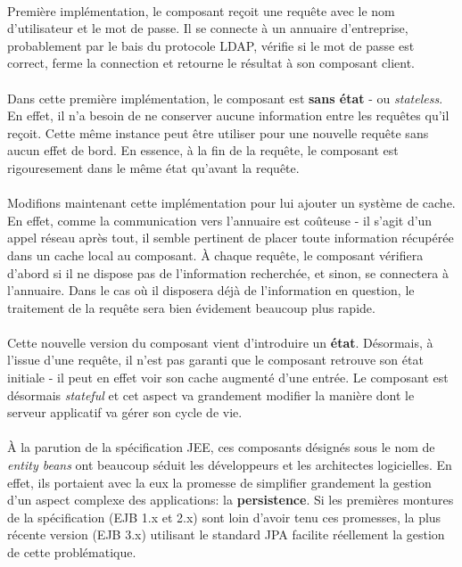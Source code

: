 {  \paragraph{} Première implémentation, le composant reçoit une requête avec le nom d'utilisateur et
  le mot de   passe. Il se connecte à un annuaire d'entreprise, probablement par le bais du
  protocole LDAP, vérifie si le mot de passe est correct, ferme la connection et retourne le
  résultat à son composant client.

  \paragraph{} Dans cette première implémentation, le composant est \textbf{sans état} - ou
  \textit{stateless}. En effet, il n'a besoin de ne conserver aucune information entre les requêtes
  qu'il reçoit. Cette même instance peut être utiliser pour une nouvelle requête sans aucun effet de
  bord. En essence, à la fin de la requête, le composant est rigouresement dans le même état
  qu'avant la requête.

  \paragraph{} Modifions maintenant cette implémentation pour lui ajouter un système de cache. En
  effet, comme la communication vers l'annuaire est coûteuse - il s'agit d'un appel réseau après
  tout, il semble pertinent de placer toute information récupérée dans un cache local au composant. À
  chaque requête, le composant vérifiera d'abord si il ne dispose pas de l'information recherchée,
  et sinon, se connectera à l'annuaire. Dans le cas où il disposera déjà de l'information en
  question, le traitement de la requête sera bien évidement beaucoup plus rapide.

  \paragraph{} Cette nouvelle version du composant vient d'introduire un \textbf{état}. Désormais, à
  l'issue d'une requête, il n'est pas garanti que le composant retrouve son état initiale - il peut
  en effet voir son cache augmenté d'une entrée. Le composant est désormais \textit{stateful} et cet
  aspect va grandement modifier la manière dont le serveur applicatif va gérer son cycle de vie.


  \paragraph{} À la parution de la spécification JEE, ces composants désignés sous le nom de
  \textit{entity beans} ont beaucoup séduit les développeurs et les architectes logicielles. En
  effet, ils portaient avec la eux la promesse de simplifier grandement la gestion d'un aspect
  complexe des applications: la \textbf{persistence}. Si les premières montures de la spécification
  (EJB 1.x et 2.x) sont loin d'avoir tenu ces promesses, la plus récente version (EJB 3.x)
  utilisant le standard JPA facilite réellement la gestion de cette problématique.

}
